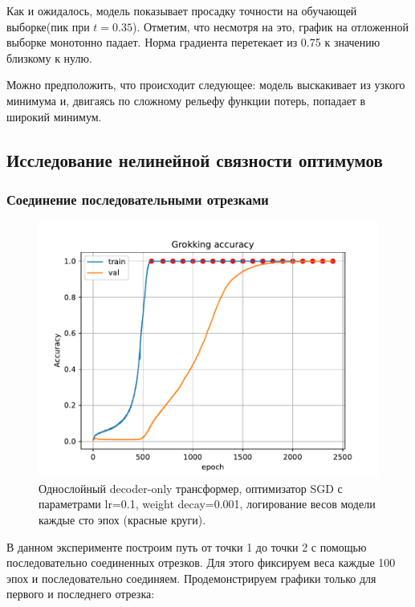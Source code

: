 \documentclass{article} %
\begin{document}
Как и ожидалось, модель показывает просадку точности на обучающей выборке(пик при $t=0.35$). Отметим, что несмотря на это, график на отложенной выборке монотонно падает. Норма градиента перетекает из 0.75 к значению близкому к нулю. 

Можно предположить, что происходит следующее: модель выскакивает из узкого минимума и, двигаясь по сложному рельефу функции потерь, попадает в широкий минимум.
\subsection{Исследование нелинейной связности оптимумов}
\subsubsection{Соединение последовательными отрезками}
\begin{figure}[!ht]
    \centering
    \includegraphics[scale=0.5]{figures/many_segments/grokking_acc.pdf}
    \caption{Однослойный decoder-only трансформер, оптимизатор SGD с параметрами lr=0.1, weight decay=0.001, логирование весов модели каждые сто эпох (красные круги).}
    \label{fig:grokking_acc_many}
\end{figure} 
В данном эксперименте построим путь от точки 1 до точки 2 с помощью последовательно соединенных отрезков. Для этого фиксируем веса каждые 100 эпох и последовательно соединяем. Продемонстрируем графики только для первого и последнего отрезка:
\end{document}
